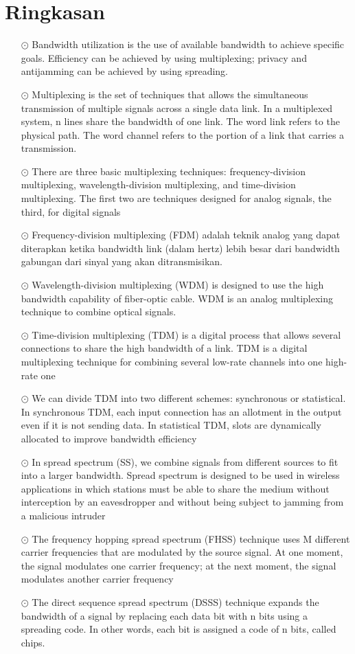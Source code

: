 \section{Ringkasan}
\begin{itemize}
  \item[$\odot$] Bandwidth utilization is the use of available bandwidth to achieve specific goals. Efficiency can be achieved by using multiplexing; privacy and antijamming can be achieved by using spreading.
  \item[$\odot$] Multiplexing is the set of techniques that allows the simultaneous transmission of multiple signals across a single data link. In a multiplexed system, n lines share the bandwidth of one link. The word link refers to the physical path. The word channel refers to the portion of a link that carries a transmission.
  \item[$\odot$] There are three basic multiplexing techniques: frequency-division multiplexing, wavelength-division multiplexing, and time-division multiplexing. The first two are techniques designed for analog signals, the third, for digital signals
  \item[$\odot$] Frequency-division multiplexing (FDM) adalah teknik analog yang dapat diterapkan ketika bandwidth link (dalam hertz) lebih besar dari bandwidth gabungan dari sinyal yang akan ditransmisikan.
  \item[$\odot$] Wavelength-division multiplexing (WDM) is designed to use the high bandwidth capability of fiber-optic cable. WDM is an analog multiplexing technique to combine optical signals.
  \item[$\odot$] Time-division multiplexing (TDM) is a digital process that allows several connections to share the high bandwidth of a link. TDM is a digital multiplexing technique for combining several low-rate channels into one high-rate one
  \item[$\odot$] We can divide TDM into two different schemes: synchronous or statistical. In synchronous TDM, each input connection has an allotment in the output even if it is not sending data. In statistical TDM, slots are dynamically allocated to improve bandwidth efficiency
  \item[$\odot$] In spread spectrum (SS), we combine signals from different sources to fit into a larger bandwidth. Spread spectrum is designed to be used in wireless applications in which stations must be able to share the medium without interception by an eavesdropper and without being subject to jamming from a malicious intruder
  \item[$\odot$] The frequency hopping spread spectrum (FHSS) technique uses M different carrier frequencies that are modulated by the source signal. At one moment, the signal modulates one carrier frequency; at the next moment, the signal modulates another carrier frequency
  \item[$\odot$] The direct sequence spread spectrum (DSSS) technique expands the bandwidth of a signal by replacing each data bit with n bits using a spreading code. In other words, each bit is assigned a code of n bits, called chips.
\end{itemize}


